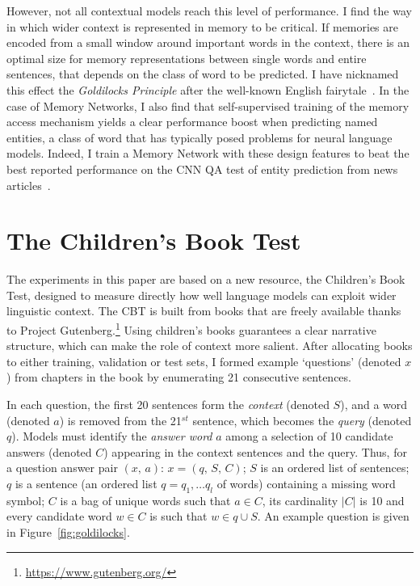 However, not all contextual models reach this level of performance. I find the way in which wider context is represented in memory to be critical.
If memories are encoded from a small window around important words in the context, there is an optimal size for memory representations between single words and entire sentences, that depends on the class of word to be predicted. I have nicknamed this effect the \emph{Goldilocks Principle} after the well-known English fairytale~\citep{goldilocks}. %
%
%
In the case of Memory Networks, I also find that self-supervised training of the memory access mechanism yields a clear performance boost when predicting named entities, a class of word that has typically posed problems for neural language models. Indeed, I train a Memory Network with these design features to beat the best reported performance on the CNN QA test of entity prediction from news articles~\citep{nips15_hermann}. 

\section{The Children's Book Test}

The experiments in this paper are based on a new resource, the Children's Book Test, designed to measure directly how well language models can exploit wider linguistic context. The CBT is built from books that are freely available thanks to Project Gutenberg.\footnote{\url{https://www.gutenberg.org/}} Using children's books guarantees a clear narrative structure, which can make the role of context more salient. After allocating books to either training, validation or test sets, I formed example `questions' (denoted \(x\)) from chapters in the book by enumerating 21 consecutive sentences. 

In each question, the first 20 sentences form the \emph{context} (denoted \(S\)), and a word (denoted \(a\)) is removed from the 21$^{st}$ sentence, which becomes the \emph{query} (denoted \(q\)). Models must identify the \emph{answer word} \(a\) among a selection of 10 candidate answers (denoted \(C\)) appearing in the context sentences and the query. Thus, for a question answer pair  $(x,\, a)$: $x = (q,\,S,\,C)$; \(S\) is an ordered list of sentences; \(q\) is a sentence (an ordered list \(q=q_1 , \dots q_l\) of words) containing a missing word symbol; \(C\) is  a bag of unique words such that \(a \in C\),  its cardinality \(|C|\) is 10 and every candidate word \(w \in C\) is such that \(w \in q \cup S\). An example question is given in Figure~\ref{fig:goldilocks}.

